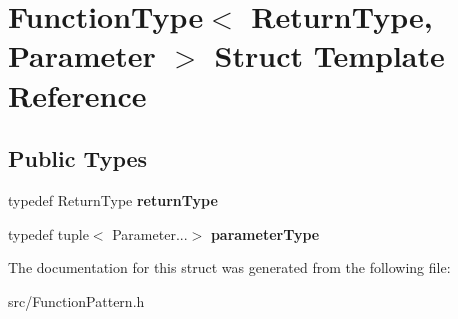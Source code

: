\hypertarget{struct_function_type}{\section{Function\-Type$<$ Return\-Type, Parameter $>$ Struct Template Reference}
\label{struct_function_type}
}
\subsection*{Public Types}
\begin{DoxyCompactItemize}
\item 
\hypertarget{struct_function_type_a1c5a68303911e21dbc4ee55a4257773e}{typedef Return\-Type {\bfseries return\-Type}}\label{struct_function_type_a1c5a68303911e21dbc4ee55a4257773e}

\item 
\hypertarget{struct_function_type_af35c0bc7751020c3e1a7b0abfc1d6885}{typedef tuple$<$ Parameter...$>$ {\bfseries parameter\-Type}}\label{struct_function_type_af35c0bc7751020c3e1a7b0abfc1d6885}

\end{DoxyCompactItemize}


The documentation for this struct was generated from the following file\-:\begin{DoxyCompactItemize}
\item 
src/Function\-Pattern.\-h\end{DoxyCompactItemize}
